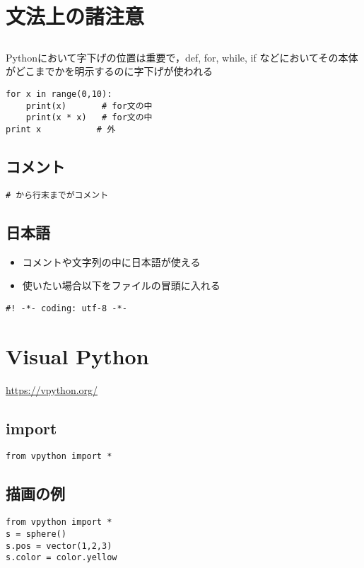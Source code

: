 \documentclass[landscape,7pt,dvipdfmx]{article}
\newcommand{\ao}[1]{{\color{blue}{#1}}}
\begin{document}
\begin{multicols*}{3}
\section{文法上の諸注意}
\subsection{\ao{字下げ}}
Pythonにおいて字下げの位置は重要で，def, for, while, if
などにおいてその本体がどこまでかを明示するのに字下げが使われる
\begin{lstlisting}
for x in range(0,10):
    print(x)       # for文の中
    print(x * x)   # for文の中
print x           # 外
\end{lstlisting}

\subsection{コメント}
\begin{lstlisting}
# から行末までがコメント
\end{lstlisting}

\subsection{日本語}
\begin{itemize}
\item コメントや文字列の中に日本語が使える
\item 使いたい場合以下をファイルの冒頭に入れる
\end{itemize}
\begin{lstlisting}
#! -*- coding: utf-8 -*-
\end{lstlisting}

\section{Visual Python}
\url{https://vpython.org/}
\subsection{import}
\begin{lstlisting}
from vpython import *  
\end{lstlisting}

\subsection{描画の例}
\begin{lstlisting}
from vpython import *  
s = sphere()
s.pos = vector(1,2,3)
s.color = color.yellow
\end{lstlisting}


\end{multicols*}
\end{document}
